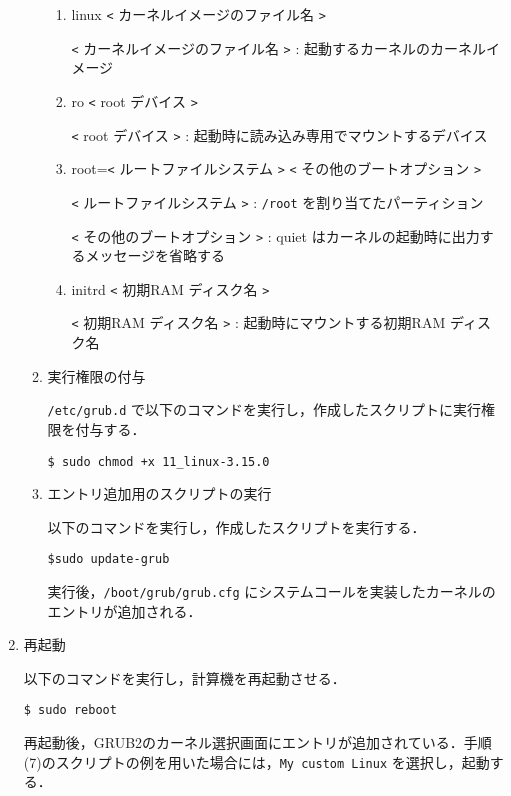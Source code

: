 \documentclass[12pt]{jsarticle}
\begin{document}
\begin{enumerate}
\begin{enumerate}
\begin{enumerate}
\item linux \verb|<| カーネルイメージのファイル名 \verb|>|

\verb|<| カーネルイメージのファイル名 \verb|>| : 起動するカーネルのカーネルイメージ

\item ro \verb|<| root デバイス \verb|>|

    \verb|<| root デバイス \verb|>| : 起動時に読み込み専用でマウントするデバイス

\item root=\verb|<| ルートファイルシステム \verb|>| \verb|<| その他のブートオプション \verb|>|

\verb|<| ルートファイルシステム \verb|>| : \verb|/root| を割り当てたパーティション

\verb|<| その他のブートオプション \verb|>| : quiet はカーネルの起動時に出力するメッセージを省略する

\item initrd \verb|<| 初期RAM ディスク名 \verb|>|

\verb|<| 初期RAM ディスク名 \verb|>| : 起動時にマウントする初期RAM ディスク名

\end{enumerate}

\item 実行権限の付与

\verb|/etc/grub.d| で以下のコマンドを実行し，作成したスクリプトに実行権限を付与する．
\begin{verbatim}
$ sudo chmod +x 11_linux-3.15.0
\end{verbatim}

\item エントリ追加用のスクリプトの実行

以下のコマンドを実行し，作成したスクリプトを実行する．
\begin{verbatim}
$sudo update-grub
\end{verbatim}
実行後，\verb|/boot/grub/grub.cfg| にシステムコールを実装したカーネルのエントリが追加される．

\end{enumerate}

\item 再起動

以下のコマンドを実行し，計算機を再起動させる．
\begin{verbatim}
$ sudo reboot
\end{verbatim}
再起動後，GRUB2のカーネル選択画面にエントリが追加されている．手順(7)のスクリプトの例を用いた場合には，\verb|My custom Linux| を選択し，起動する．


\end{enumerate}
\end{document}
